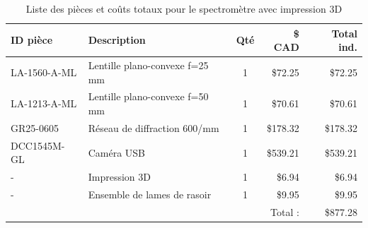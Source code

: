 \documentclass[11pt,letterpaper]{article}
\begin{document}
\begin{table}[!ht]
    \centering
    \caption{Liste des pièces et coûts totaux pour le spectromètre avec impression 3D}
    \begin{tabular}{|l|l|c|r|r|}
    \hline
        ID pièce & Description & Qté & \$ CAD & Total ind. \\ \hline\hline
        LA-1560-A-ML & Lentille plano-convexe f=25 mm & 1 & \$72.25 & \$72.25 \\ \hline
        LA-1213-A-ML & Lentille plano-convexe f=50 mm & 1 & \$70.61 & \$70.61 \\ \hline
        GR25-0605 & Réseau de diffraction 600/mm & 1 & \$178.32 & \$178.32 \\ \hline
        DCC1545M-GL & Caméra USB & 1 & \$539.21 & \$539.21 \\ \hline
        - & Impression 3D & 1 & \$6.94 & \$6.94 \\ \hline
        - & Ensemble de lames de rasoir & 1 & \$9.95 & \$9.95 \\ \hline\hline
        ~ & ~ & ~ & Total : & \$877.28 \\ \hline
    \end{tabular}
    \label{prix_3D}
\end{table}

% 
% 
\end{document}
